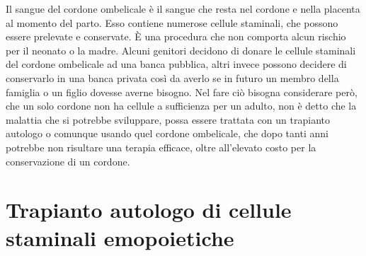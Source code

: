 Il sangue del cordone ombelicale è il sangue che resta nel cordone e nella placenta al momento del parto. 
Esso contiene numerose cellule staminali, che possono essere prelevate e conservate. 
È una procedura che non comporta alcun rischio per il neonato o la madre. 
Alcuni genitori decidono di donare le cellule staminali del cordone ombelicale ad una banca pubblica, altri invece 
possono decidere di conservarlo in una banca privata così da averlo se in futuro un membro della famiglia o un figlio 
dovesse averne bisogno. Nel fare ciò bisogna considerare però, che un solo cordone non ha cellule a sufficienza per un 
adulto, non è detto che la malattia che si potrebbe sviluppare, possa essere trattata con un trapianto autologo o 
comunque usando quel cordone ombelicale, che dopo tanti anni potrebbe non risultare una terapia efficace, oltre 
all’elevato costo per la conservazione di un cordone\cite{STEMCELLS}.

\section{Trapianto autologo di cellule staminali emopoietiche}

